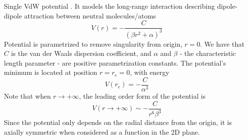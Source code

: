 \documentclass[10pt,aps,onecolumn,superscriptaddress]{revtex4-2}
\begin{document}
Single VdW potential \cite{Soley2018}. It models the long-range interaction describing dipole-dipole attraction between neutral molecules/atoms
\begin{equation}
    V(r) = -\dfrac{C}{(\beta r^2 + \alpha)^3}
    \label{eq:vdw-single}
\end{equation}
Potential is parametrized to remove singularity from origin, $r = 0$. We have that $C$ is the van der Waals dispersion coefficient, and $\alpha$ and $\beta$  - the characteristic length parameter - are positive parametrization constants. The potential's minimum is located at position $r = r_e = 0$, with energy 
\begin{equation}
    V\left(r_e \right) = - \dfrac{C}{\alpha^3}
\end{equation}
Note that when $r \longrightarrow + \infty$, the leading order form of the potential is
\begin{equation}
    V(r \longrightarrow +\infty) \sim - \frac{C}{r^6 \beta^3}
\end{equation}
Since the potential only depends on the radial distance from the origin, it is axially symmetric when considered as a function in the 2D plane.
\end{document}
